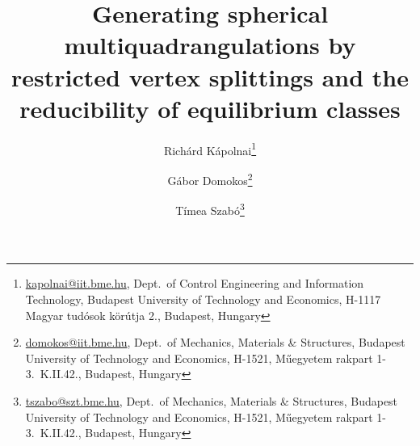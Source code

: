 \documentclass[]{article}
\newenvironment{frontmatter}{}{\maketitle}
\begin{document}
\begin{frontmatter}

\title{Generating spherical multiquadrangulations by restricted vertex splittings and the reducibility of equilibrium classes}

\author{
Richárd Kápolnai\footnote{\url{kapolnai@iit.bme.hu},
Dept.\ of Control Engineering and Information Technology, Budapest University of Technology and Economics, H-1117 Magyar tudósok körútja 2., Budapest, Hungary
}
\and
Gábor Domokos\footnote{\url{domokos@iit.bme.hu},
Dept.\ of Mechanics, Materials \& Structures, Budapest University of Technology and Economics, H-1521, Műegyetem rakpart 1-3.\ K.II.42., Budapest, Hungary
}
\and
Tímea Szabó\footnote{\url{tszabo@szt.bme.hu},
Dept.\ of Mechanics, Materials \& Structures, Budapest University of Technology and Economics, H-1521, Műegyetem rakpart 1-3.\ K.II.42., Budapest, Hungary
}
}







\end{frontmatter}
\end{document}
